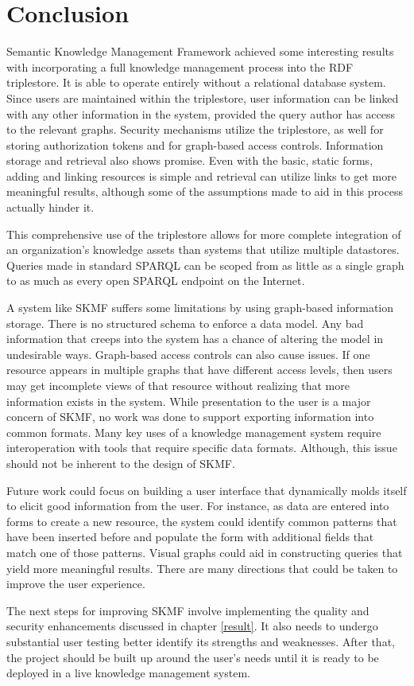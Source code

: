 \chapter{Conclusion}
\label{concl}

Semantic Knowledge Management Framework achieved some interesting results with incorporating a full knowledge management process into the RDF triplestore. It is able to operate entirely without a relational database system. Since users are maintained within the triplestore, user information can be linked with any other information in the system, provided the query author has access to the relevant graphs. Security mechanisms utilize the triplestore, as well for storing authorization tokens and for graph-based access controls. Information storage and retrieval also shows promise. Even with the basic, static forms, adding and linking resources is simple and retrieval can utilize links to get more meaningful results, although some of the assumptions made to aid in this process actually hinder it.

This comprehensive use of the triplestore allows for more complete integration of an organization's knowledge assets than systems that utilize multiple datastores. Queries made in standard SPARQL can be scoped from as little as a single graph to as much as every open SPARQL endpoint on the Internet.

A system like SKMF suffers some limitations by using graph-based information storage. There is no structured schema to enforce a data model. Any bad information that creeps into the system has a chance of altering the model in undesirable ways. Graph-based access controls can also cause issues. If one resource appears in multiple graphs that have different access levels, then users may get incomplete views of that resource without realizing that more information exists in the system. While presentation to the user is a major concern of SKMF, no work was done to support exporting information into common formats. Many key uses of a knowledge management system require interoperation with tools that require specific data formats. Although, this issue should not be inherent to the design of SKMF.

Future work could focus on building a user interface that dynamically molds itself to elicit good information from the user. For instance, as data are entered into forms to create a new resource, the system could identify common patterns that have been inserted before and populate the form with additional fields that match one of those patterns. Visual graphs could aid in constructing queries that yield more meaningful results. There are many directions that could be taken to improve the user experience.

The next steps for improving SKMF involve implementing the quality and security enhancements discussed in chapter
\ref{result}.
It also needs to undergo substantial user testing better identify its strengths and weaknesses. After that, the project should be built up around the user's needs until it is ready to be deployed in a live knowledge management system.
